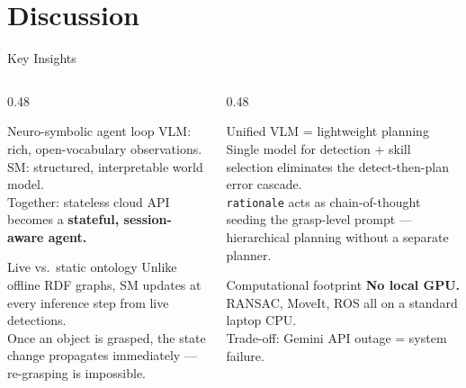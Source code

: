 \documentclass[aspectratio=169, 10pt]{beamer}
\begin{document}
\section{Discussion}

\begin{frame}{Key Insights}
  \begin{columns}[T]
    \begin{column}{0.48\textwidth}
      \begin{block}{Neuro-symbolic agent loop}
        \small
        VLM: rich, open-vocabulary observations.\\
        \textsc{SM}: structured, interpretable world model.\\[0.2em]
        Together: stateless cloud API becomes a
        \textbf{stateful, session-aware agent.}
      \end{block}
      \vspace{0.3em}
      \begin{block}{Live vs.\ static ontology}
        \small
        Unlike offline RDF graphs, \textsc{SM} updates
        at every inference step from live detections.\\[0.2em]
        Once an object is grasped, the state change propagates
        immediately --- re-grasping is impossible.
      \end{block}
    \end{column}

    \begin{column}{0.48\textwidth}
      \begin{block}{Unified VLM = lightweight planning}
        \small
        Single model for detection + skill selection
        eliminates the detect-then-plan error cascade.\\[0.2em]
        \texttt{rationale} acts as chain-of-thought seeding the
        grasp-level prompt --- hierarchical planning without
        a separate planner.
      \end{block}
      \vspace{0.3em}
      \begin{alertblock}{Computational footprint}
        \small
        \textbf{No local GPU.} RANSAC, MoveIt, ROS all on
        a standard laptop CPU.\\[0.2em]
        Trade-off: Gemini API outage = system failure.
      \end{alertblock}
    \end{column}
  \end{columns}
\end{frame}
\end{document}
